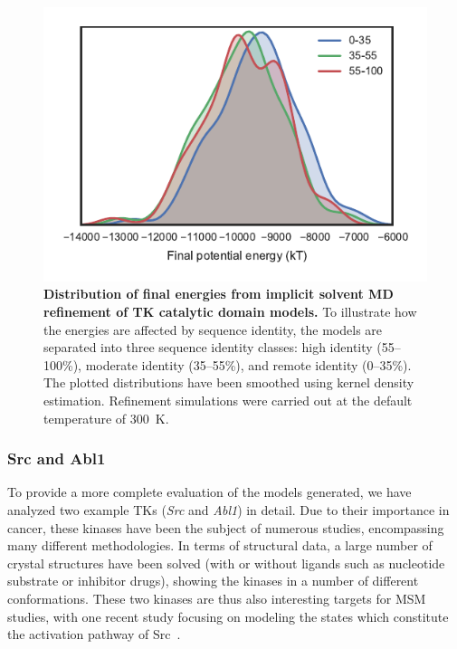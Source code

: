 \documentclass[aps,pre,twocolumn,nofootinbib,superscriptaddress,linenumbers]{revtex4-1}
\begin{document}
\begin{figure}[tbp]
    \includegraphics[width=1.0\columnwidth]{energies/energies.pdf}

    \caption{{\bf Distribution of final energies from implicit solvent MD refinement of TK catalytic domain models.}
    To illustrate how the energies are affected by sequence identity, the models are separated into three sequence identity classes: high identity (55--100\%), moderate identity (35--55\%), and remote identity (0--35\%).
    The plotted distributions have been smoothed using kernel density estimation.
    Refinement simulations were carried out at the default temperature of 300~K.
  }
  \label{figure:energies-implicit}
\end{figure}


\subsubsection*{Src and Abl1}

To provide a more complete evaluation of the models generated, we have analyzed two example TKs (\emph{Src} and \emph{Abl1}) in detail.
Due to their importance in cancer, these kinases have been the subject of numerous studies, encompassing many different methodologies.
In terms of structural data, a large number of crystal structures have been solved (with or without ligands such as nucleotide substrate or inhibitor drugs), showing the kinases in a number of different conformations.
These two kinases are thus also interesting targets for MSM studies, with one recent study focusing on modeling the states which constitute the activation pathway of Src~\cite{shukla-pande:nature-commun:2014:src-activation-msm}.
\end{document}
